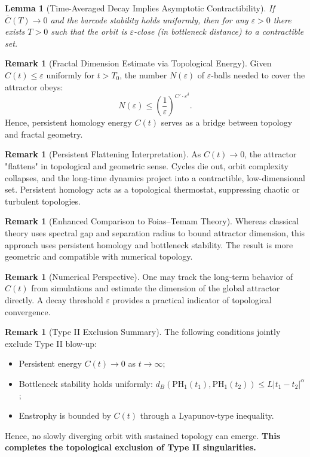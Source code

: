 \documentclass[11pt]{article}
\newtheorem{lemma}[theorem]{Lemma}
\theoremstyle{definition}
\newtheorem{remark}[theorem]{Remark}
\begin{document}
\begin{lemma}[Time-Averaged Decay Implies Asymptotic Contractibility]
If $\overline{C}(T) \to 0$ and the barcode stability holds uniformly, then for any $\varepsilon > 0$ there exists $T > 0$ such that the orbit is $\varepsilon$-close (in bottleneck distance) to a contractible set.
\end{lemma}

\begin{remark}[Fractal Dimension Estimate via Topological Energy]
Given $C(t) \le \varepsilon$ uniformly for $t > T_0$, the number $N(\varepsilon)$ of $\varepsilon$-balls needed to cover the attractor obeys:
\[
N(\varepsilon) \le \left(\frac{1}{\varepsilon}\right)^{C' \cdot \varepsilon^\delta}.
\]
Hence, persistent homology energy $C(t)$ serves as a bridge between topology and fractal geometry.
\end{remark}

\begin{remark}[Persistent Flattening Interpretation]
As $C(t) \to 0$, the attractor "flattens" in topological and geometric sense. Cycles die out, orbit complexity collapses, and the long-time dynamics project into a contractible, low-dimensional set. Persistent homology acts as a topological thermostat, suppressing chaotic or turbulent topologies.
\end{remark}

\begin{remark}[Enhanced Comparison to Foias--Temam Theory]
Whereas classical theory uses spectral gap and separation radius to bound attractor dimension, this approach uses persistent homology and bottleneck stability. The result is more geometric and compatible with numerical topology.
\end{remark}

\begin{remark}[Numerical Perspective]
One may track the long-term behavior of $C(t)$ from simulations and estimate the dimension of the global attractor directly. A decay threshold $\varepsilon$ provides a practical indicator of topological convergence.
\end{remark}

\begin{remark}[Type II Exclusion Summary]
The following conditions jointly exclude Type II blow-up:
\begin{itemize}
  \item Persistent energy $C(t) \to 0$ as $t \to \infty$;
  \item Bottleneck stability holds uniformly: $d_B(\mathrm{PH}_1(t_1), \mathrm{PH}_1(t_2)) \le L|t_1 - t_2|^{\alpha}$;
  \item Enstrophy is bounded by $C(t)$ through a Lyapunov-type inequality.
\end{itemize}
Hence, no slowly diverging orbit with sustained topology can emerge. \textbf{This completes the topological exclusion of Type II singularities.}
\end{remark}
\end{document}
